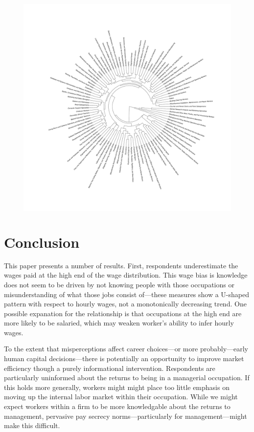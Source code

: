 \documentclass[11pt]{article}
\begin{document}
\begin{figure}
\begin{minipage}{0.90 \linewidth}
\includegraphics[width = \linewidth]{./plots/dendrogram.pdf}
\end{minipage}  
\end{figure} 

\section{Conclusion} 

This paper presents a number of results. 
First, respondents underestimate the wages paid at the high end of the wage distribution. 
This wage bias is knowledge does not seem to be driven by not knowing people with those occupations or misunderstanding of what those jobs consist of---these measures show a U-shaped pattern with respect to hourly wages, not a monotonically decreasing trend.  
One possible expanation for the relationship is that occupations at the high end are more likely to be salaried, which may weaken worker's ability to infer hourly wages. 

To the extent that misperceptions affect career choices---or more probably---early human capital decisions---there is potentially an opportunity to improve market efficiency though a purely informational intervention. 
Respondents are particularly uninformed about the returns to being in a managerial occupation. 
If this holds more generally, workers might might place too little emphasis on moving up the internal labor market within their occupation.
While we might expect workers within a firm to be more knowledgable about the returns to management, pervasive pay secrecy norms---particularly for management---might make this difficult.  
 
\end{document}
